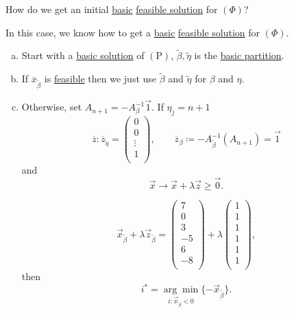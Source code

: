 \begin{problem}\label{prob:phase-one-problem}
How do we get an initial \hyperref[def:basic-solution]{basic} \hyperref[def:feasible-solution]{feasible solution} for \((\Phi)\)?
\end{problem}
\begin{answer}
	In this case, we know how to get a \hyperref[def:basic-solution]{basic} \hyperref[def:feasible-solution]{feasible solution} for \((\Phi)\).
	\begin{enumerate}[(a)]
		\item Start with a \hyperref[def:basic-solution]{basic solution} of \((\mathrm{P})\), \(\tilde{\beta}, \tilde{\eta}\) is the \hyperref[def:basic-partition]{basic partition}.
		\item If \(\overline{x}_{\tilde{\beta}}\) is \hyperref[def:feasible-solution]{feasible} then we just use \(\tilde{\beta}\) and \(\tilde{\eta}\) for \(\beta\) and \(\eta\).
		\item Otherwise, set \(A_{n+1} = -A^{-1}_{\beta}\vec{1}\). If \(\eta_j = n+1\)
		      \[
			      \overline{z} : \overline{z}_{\tilde{\eta}} = \begin{pmatrix}
				      0      \\
				      0      \\
				      \vdots \\
				      1      \\
			      \end{pmatrix},\qquad \overline{z}_{\beta} \coloneqq -A^{-1}_{\tilde{\beta}}(A_{n+1}) = \vec{1}
		      \]
		      and\[
			      \vec{x} \to \vec{x} + \lambda \vec{z} \geq \vec{0}.
		      \] \begin{eg}
			      \[
				      \vec{x}_{\tilde{\beta}} + \lambda \vec{z}_{\tilde{\beta}} = \begin{pmatrix}
					      7  \\
					      0  \\
					      3  \\
					      -5 \\
					      6  \\
					      -8 \\
				      \end{pmatrix} + \lambda \begin{pmatrix}
					      1 \\
					      1 \\
					      1 \\
					      1 \\
					      1 \\
					      1 \\
				      \end{pmatrix},
			      \]
			      then
			      \[
				      i^{\ast} = \underset{i:\vec{x}_{\tilde{\beta}} < 0}{\arg\min}\{-\vec{x}_{\tilde{\beta}}\}.
			      \]
		      \end{eg}
	\end{enumerate}
\end{answer}

